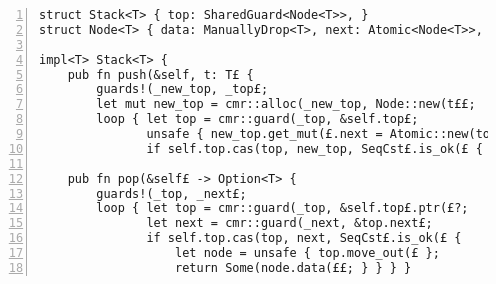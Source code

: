 \begin{lstlisting}[caption=\code{Stack::push} and \code{Stack::pop},label=lst:stack-ops,
    numbers=left, numberstyle=\color{gray}\ttfamily{}ST,
]
struct Stack<T> { top: SharedGuard<Node<T>>, }
struct Node<T> { data: ManuallyDrop<T>, next: Atomic<Node<T>>, }

impl<T> Stack<T> {
    pub fn push(&self, t: T£ {
        guards!(_new_top, _top£;
        let mut new_top = cmr::alloc(_new_top, Node::new(t££;
        loop { let top = cmr::guard(_top, &self.top£;
               unsafe { new_top.get_mut(£.next = Atomic::new(top£; }
               if self.top.cas(top, new_top, SeqCst£.is_ok(£ { break; } } }

    pub fn pop(&self£ -> Option<T> {
        guards!(_top, _next£;
        loop { let top = cmr::guard(_top, &self.top£.ptr(£?;
               let next = cmr::guard(_next, &top.next£;
               if self.top.cas(top, next, SeqCst£.is_ok(£ {
                   let node = unsafe { top.move_out(£ };
                   return Some(node.data(££; } } } }
\end{lstlisting}
